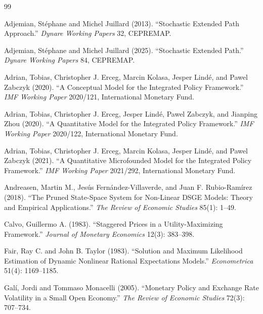 \documentclass[12pt]{article}
\begin{document}

\begin{thebibliography}{99}

Adjemian, Stéphane and Michel Juillard (2013).
\newblock ``Stochastic Extended Path Approach.''
\newblock \textit{Dynare Working Papers} 32, CEPREMAP.

Adjemian, Stéphane and Michel Juillard (2025).
\newblock ``Stochastic Extended Path.''
\newblock \textit{Dynare Working Papers} 84, CEPREMAP.

Adrian, Tobias, Christopher J. Erceg, Marcin Kolasa, Jesper Lindé, and Pawel Zabczyk (2020).
\newblock ``A Conceptual Model for the Integrated Policy Framework.''
\newblock \textit{IMF Working Paper} 2020/121, International Monetary Fund.

Adrian, Tobias, Christopher J. Erceg, Jesper Lindé, Pawel Zabczyk, and Jianping Zhou (2020).
\newblock ``A Quantitative Model for the Integrated Policy Framework.''
\newblock \textit{IMF Working Paper} 2020/122, International Monetary Fund.

Adrian, Tobias, Christopher J. Erceg, Marcin Kolasa, Jesper Lindé, and Pawel Zabczyk (2021).
\newblock ``A Quantitative Microfounded Model for the Integrated Policy Framework.''
\newblock \textit{IMF Working Paper} 2021/292, International Monetary Fund.

Andreasen, Martin M., Jesús Fernández-Villaverde, and Juan F. Rubio-Ramírez (2018).
\newblock ``The Pruned State-Space System for Non-Linear DSGE Models: Theory and Empirical Applications.''
\newblock \textit{The Review of Economic Studies} 85(1): 1--49.

Calvo, Guillermo A. (1983).
\newblock ``Staggered Prices in a Utility-Maximizing Framework.''
\newblock \textit{Journal of Monetary Economics} 12(3): 383--398.

Fair, Ray C. and John B. Taylor (1983).
\newblock ``Solution and Maximum Likelihood Estimation of Dynamic Nonlinear Rational Expectations Models.''
\newblock \textit{Econometrica} 51(4): 1169--1185.

Galí, Jordi and Tommaso Monacelli (2005).
\newblock ``Monetary Policy and Exchange Rate Volatility in a Small Open Economy.''
\newblock \textit{The Review of Economic Studies} 72(3): 707--734.


\end{thebibliography}
\end{document}
